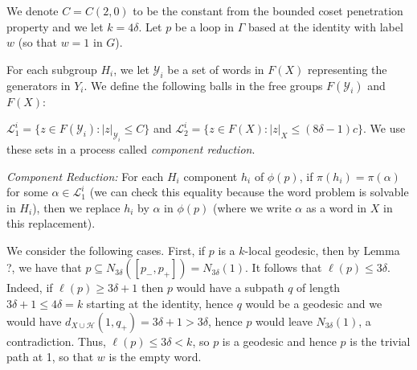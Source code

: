 \documentclass[12pt]{article}
\newcommand{\vs}{\vskip10pt}
\begin{document}
	\vs 
	
	We denote $C = C(2,0)$ to be the constant from the bounded coset penetration property and we let $k = 4\delta$. Let $p$ be a loop in $\Gamma$ based at the identity with label $w$ (so that $w = 1$ in $G$). 
	
	\vs 
	
	For each subgroup $H_i$, we let $\mathcal{Y}_i$ be a set of words in $F(X)$ representing the generators in $Y_i$. We define the following balls in the free groups $F(\mathcal{Y}_i)$ and $F(X)$: 
	
	\vs 
	
	$\mathcal{L}_1^i = \{z \in F(\mathcal{Y}_i): \vert z \vert_{\mathcal{Y}_i} \leq C\}$ and $\mathcal{L}_2^i = \{z \in F(X): \vert z \vert_X \leq (8 \delta-1)c\}$. We use these sets in a process called \textit{component reduction}. 
	
	\vs 
	
	\textit{Component Reduction: } For each $H_i$ component $h_i$ of $\phi(p)$, if $\pi(h_i) = \pi(\alpha)$ for some $\alpha \in \mathcal{L}_1^i$ (we can check this equality because the word problem is solvable in $H_i$), then we replace $h_i$ by $\alpha$ in $\phi(p)$ (where we write $\alpha$ as a word in $X$ in this replacement).  
	
	\vs 
	
	We consider the following cases. First, if $p$ is a $k$-local geodesic, then by Lemma ?, we have that $p \subseteq N_{3 \delta}([p_-, p_+]) = N_{3 \delta}(1)$. It follows that $\ell(p) \leq 3 \delta$. Indeed, if $\ell(p) \geq 3 \delta + 1$ then $p$ would have a subpath $q$ of length $3 \delta + 1 \leq 4 \delta = k$ starting at the identity, hence $q$ would be a geodesic and we would have $d_{X \cup \mathcal{H}}(1, q_+) = 3 \delta + 1 > 3 \delta$, hence $p$ would leave $N_{3 \delta}(1)$, a contradiction. Thus, $\ell(p) \leq 3 \delta < k$, so $p$ is a geodesic and hence $p$ is the trivial path at 1, so that $w$ is the empty word. 
	
	\vs 
	
\end{document}
